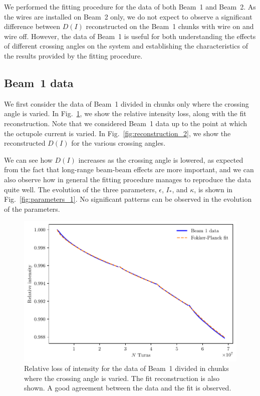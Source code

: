 We performed the fitting procedure for the data of both Beam~1 and Beam~2. As the wires are installed on Beam~2 only, we do not expect to observe a significant difference between $D(I)$ reconstructed on the Beam~1 chunks with wire on and wire off. However, the data of Beam~1 is useful for both understanding the effects of different crossing angles on the system and establishing the characteristics of the results provided by the fitting procedure.

\subsection*{Beam~1 data}

We first consider the data of Beam~1 divided in chunks only where the crossing angle is varied. In Fig.~\ref{fig:reconstruction_1}, we show the relative intensity loss, along with the fit reconstruction. Note that we considered Beam~1 data up to the point at which the octupole current is varied. In Fig.~\ref{fig:reconstruction_2}, we show the reconstructed $D(I)$ for the various crossing angles.

We can see how $D(I)$ increases as the crossing angle is lowered, as expected from the fact that long-range beam-beam effects are more important, and we can also observe how in general the fitting procedure manages to reproduce the data quite well. The evolution of the three parameters, $\epsilon$, $I_\ast$, and $\kappa$, is shown in Fig.~\ref{fig:parameters_1}. No significant patterns can be observed in the evolution of the parameters.%

\begin{figure}[hpt]
    \centering
    \includegraphics[width=1.0\textwidth]{5_wire_compensators_LHC/figs/losses_b1.pdf}
    \caption{Relative loss of intensity for the data of Beam~1 divided in chunks where the crossing angle is varied. The fit reconstruction is also shown. A good agreement between the data and the fit is observed.}
    \label{fig:reconstruction_1}
\end{figure}

